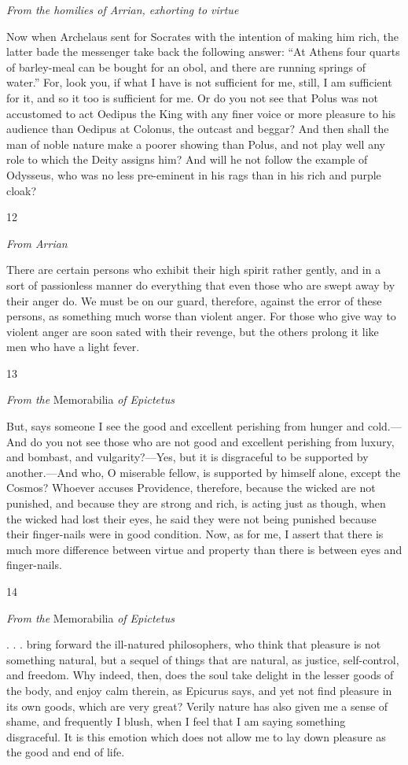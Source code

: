 \emph{From the homilies of Arrian, exhorting to virtue}

Now when Archelaus sent for Socrates with the intention of making him rich, the latter bade the messenger take back the following answer: ``At Athens four quarts of barley-meal can be bought for an obol, and there are running springs of water.'' For, look you, if what I have is not sufficient for me, still, I am sufficient for it, and so it too is sufficient for me. Or do you not see that Polus was not accustomed to act Oedipus the King with any finer voice or more pleasure to his audience than Oedipus at Colonus, the outcast and beggar? And then shall the man of noble nature make a poorer showing than Polus, and not play well any role to which the Deity assigns him? And will he not follow the example of Odysseus, who was no less pre-eminent in his rags than in his rich and purple cloak?

12

\emph{From Arrian}

There are certain persons who exhibit their high spirit rather gently, and in a sort of passionless manner do everything that even those who are swept away by their anger do. We must be on our guard, therefore, against the error of these persons, as something much worse than violent anger. For those who give way to violent anger are soon sated with their revenge, but the others prolong it like men who have a light fever.

13

\emph{From the} Memorabilia \emph{of Epictetus}

But, says someone I see the good and excellent perishing from hunger and cold.—And do you not see those who are not good and excellent perishing from luxury, and bombast, and vulgarity?—Yes, but it is disgraceful to be supported by another.—And who, O miserable fellow, is supported by himself alone, except the Cosmos? Whoever accuses Providence, therefore, because the wicked are not punished, and because they are strong and rich, is acting just as though, when the wicked had lost their eyes, he said they were not being punished because their finger-nails were in good condition. Now, as for me, I assert that there is much more difference between virtue and property than there is between eyes and finger-nails.

14

\emph{From the} Memorabilia \emph{of Epictetus}

. . . bring forward the ill-natured philosophers, who think that pleasure is not something natural, but a sequel of things that are natural, as justice, self-control, and freedom. Why indeed, then, does the soul take delight in the lesser goods of the body, and enjoy calm therein, as Epicurus says, and yet not find pleasure in its own goods, which are very great? Verily nature has also given me a sense of shame, and frequently I blush, when I feel that I am saying something disgraceful. It is this emotion which does not allow me to lay down pleasure as the good and end of life.

